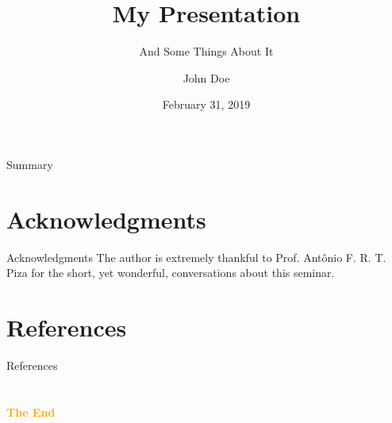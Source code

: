 \documentclass[aspectratio=43]{beamer}
\title{My Presentation} %
\subtitle{And Some Things About It}
\author[J. Doe]{John Doe}
\institute[IFUSP]{
    Institute of Physics%
    \\%
    University of São Paulo%
} %
\date{February 31, 2019}
\begin{document}
    
    \frame{\titlepage}
    
    \begin{frame}{Summary}
        \tableofcontents
    \end{frame}
    
    
    
    
    
    
    \section*{Acknowledgments} %
        \begin{frame}{Acknowledgments}
            The author is extremely thankful to Prof. Antônio F. R. T. Piza for the short, yet wonderful, conversations about this seminar.
        \end{frame}
    
    \section*{References} %
        \nocite{Djairo} \nocite{PhilPanof} \nocite{Fleming} \nocite{Shankar}
        \begin{frame}{References}
            \printbibliography
        \end{frame}

    \section{}
    \begin{frame}{}
        \centering
            \Huge\bfseries
        \textcolor{orange}{The End}
    \end{frame}
\end{document}

